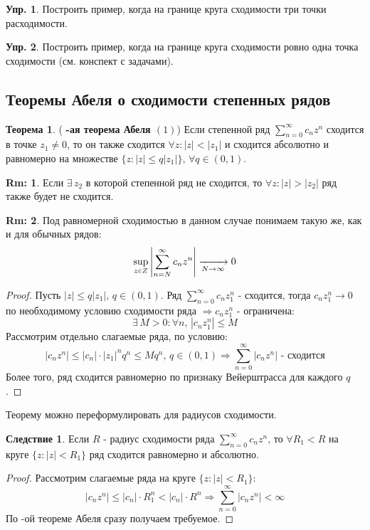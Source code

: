 \documentclass[12pt]{article}
\newcommand{\RN}[1]{%
	\textup{\uppercase\expandafter{\romannumeral#1}}%
}
\theoremstyle{definition}
\newtheorem{rem}{Rm:}
\newtheorem{exrc}{Упр.}
\newtheorem{theorem}{Теорема}
\newtheorem{corollary}{Следствие}
\newcommand{\ddsum}[2]{\displaystyle\sum\limits_{#1}^{#2}}
\newcommand{\smallerrel}[1]{\mathrel{\mathpalette\smallerrelaux{#1}}}
\newcommand{\smallerrelaux}[2]{\raisebox{.1ex}{\scalebox{.75}{$#1#2$}}}
\newcommand{\smallin}{\smallerrel{\in}}
\begin{document}
\begin{exrc}
	Построить пример, когда на границе круга сходимости три точки расходимости.
\end{exrc}
\begin{exrc}
	Построить пример, когда на границе круга сходимости ровно одна точка сходимости (см. конспект с задачами).
\end{exrc}

\subsection*{Теоремы Абеля о сходимости степенных рядов}

\begin{theorem}(\textbf{\RN{1}-ая теорема Абеля $(1)$})
	Если степенной ряд $\ddsum{n = 0}{\infty}c_n z^n$ сходится в точке $z_1 \neq 0$, то он также сходится $\forall z \colon |z| < |z_1|$ и сходится абсолютно и равномерно на множестве $\{z \colon |z| \leq q|z_1|\}, \, \forall q \in (0,1)$.
\end{theorem}
\begin{rem}
	Если $\exists \, z_2$ в которой степенной ряд не сходится, то $\forall z \colon |z| > |z_2|$ ряд также будет не сходится.
\end{rem}
\begin{rem}
	Под равномерной сходимостью в данном случае понимаем такую же, как и для обычных рядов:
	$$
		\sup\limits_{z \smallin Z}\left|\ddsum{n = N}{\infty}c_n z^n \right|\xrightarrow[N \to \infty]{} 0
	$$
\end{rem}

\begin{proof}
	Пусть $|z| \leq q|z_1|, \, q \in (0,1)$. Ряд $\ddsum{n = 0}{\infty}c_n z_1^n$ - сходится, тогда $c_n z_1^n \to 0$ по необходимому условию сходимости ряда $\Rightarrow c_n z_1^n$ - ограничена:
	$$
		\exists \, M > 0 \colon \forall n, \, |c_n z_1^n| \leq M
	$$
	Рассмотрим отдельно слагаемые ряда, по условию:
	$$
		|c_n z^n| \leq |c_n|{\cdot}|z_1|^n q^n \leq M q^n, \, q \in (0,1) \Rightarrow \ddsum{n = 0}{\infty}|c_n z^n| \text{ - сходится}
	$$
	Более того, ряд сходится равномерно по признаку Вейерштрасса для каждого $q$.
\end{proof}
Теорему можно переформулировать для радиусов сходимости.
\begin{corollary}
	Если $R$ - радиус сходимости ряда $\ddsum{n = 0}{\infty}c_n z^n$, то $\forall R_1 < R$ на круге $\{z \colon |z| < R_1\}$ ряд сходится равномерно и абсолютно.
\end{corollary}
\begin{proof}
	Рассмотрим слагаемые ряда на круге $\{z \colon |z| < R_1\}$:
	$$
		|c_n z^n| \leq |c_n|{\cdot}R_1^n < |c_n|{\cdot}R^n \Rightarrow \ddsum{n = 0}{\infty}|c_n z^n| < \infty
	$$
	По \RN{1}-ой теореме Абеля сразу получаем требуемое.
\end{proof}
\end{document}
